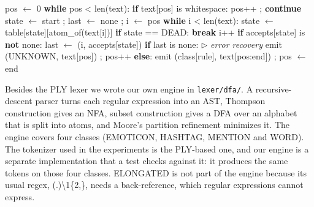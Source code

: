 \documentclass{ieeeaccess}
\begin{document}
\begin{algorithm}[!tb]
\scriptsize
\caption{Longest-match scanner with error recovery}\label{alg:3}
\begin{algorithmic}[1]
\State \hspace*{1.0em}pos $\leftarrow$ 0
\State \hspace*{1.0em}\textbf{while} pos \textless{} len(text):
\State \hspace*{2.0em}\textbf{if} text[pos] is whitespace: pos++ ; \textbf{continue}
\State \hspace*{2.0em}state $\leftarrow$ start ; last $\leftarrow$ none ; i $\leftarrow$ pos
\State \hspace*{2.0em}\textbf{while} i \textless{} len(text):
\State \hspace*{3.0em}state $\leftarrow$ table[state][atom\_of(text[i])]
\State \hspace*{3.0em}\textbf{if} state == DEAD: \textbf{break}
\State \hspace*{3.0em}i++
\State \hspace*{3.0em}\textbf{if} accepts[state] is \textbf{not} none:
\State \hspace*{4.0em}last $\leftarrow$ (i, accepts[state])
\State \hspace*{2.0em}\textbf{if} last is none: \hfill{\scriptsize$\triangleright$ \textit{error recovery}}
\State \hspace*{3.0em}emit (UNKNOWN, text[pos]) ; pos++
\State \hspace*{2.0em}\textbf{else}:
\State \hspace*{3.0em}emit (class[rule], text[pos:end]) ; pos $\leftarrow$ end
\end{algorithmic}
\end{algorithm}

Besides the PLY lexer we wrote our own engine in \texttt{lexer/\allowbreak{}dfa/\allowbreak{}}. A recursive-descent parser turns each regular expression into an AST, Thompson construction \cite{r5} gives an NFA, subset construction \cite{r6} gives a DFA over an alphabet that is split into atoms, and Moore's partition refinement \cite{r7} minimizes it. The engine covers four classes (EMOTICON, HASHTAG, MENTION and WORD). The tokenizer used in the experiments is the PLY-based one, and our engine is a separate implementation that a test checks against it: it produces the same tokens on those four classes. ELONGATED is not part of the engine because its usual regex, (.)\textbackslash{}1\{2,\}, needs a back-reference, which regular expressions cannot express.
\end{document}
